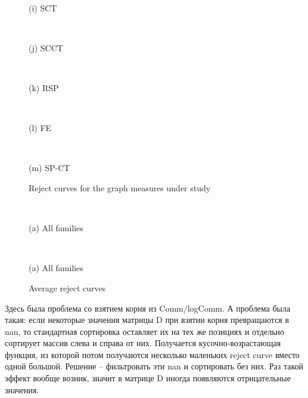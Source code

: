 \documentclass{article}
\begin{document}
\begin{figure}[H]
	\begin{minipage}{.195\textwidth} %
		\\\centerline{(i) SCT}
	\end{minipage}
	\begin{minipage}{.195\textwidth} %
		\\\centerline{(j) SCCT}
	\end{minipage}
	\begin{minipage}{.195\textwidth} %
		\\\centerline{(k) RSP}
	\end{minipage}
	\begin{minipage}{.195\textwidth} %
		\\\centerline{(l) FE}
	\end{minipage}
	\begin{minipage}{.195\textwidth} %
		\\\centerline{(m) SP-CT}
	\end{minipage}

    \caption{\label{f_Reject}Reject curves for the graph measures under study}
\end{figure}

\begin{figure}[H] %
	\begin{minipage}{.56\textwidth}
		\\\centerline{(a) All families}
	\end{minipage}%
	\begin{minipage}{.56\textwidth}
		\\\centerline{(a) All families}
	\end{minipage}%
\caption{\label{f_Rcur}Average reject curves}
\end{figure}

Здесь была проблема со взятием корня из Comm/logComm. А проблема была такая: если некоторые значения матрицы D при взятии корня превращаются в nan, то стандартная сортировка оставляет их на тех же позициях и отдельно сортирует массив слева и справа от них. Получается кусочно-возрастающая функция, из которой потом получаются несколько маленьких reject curve вместо одной большой. Решение -- фильтровать эти nan и сортировать без них. Раз такой эффект вообще возник, значит в матрице D иногда появляются отрицательные значения.
\end{document}
